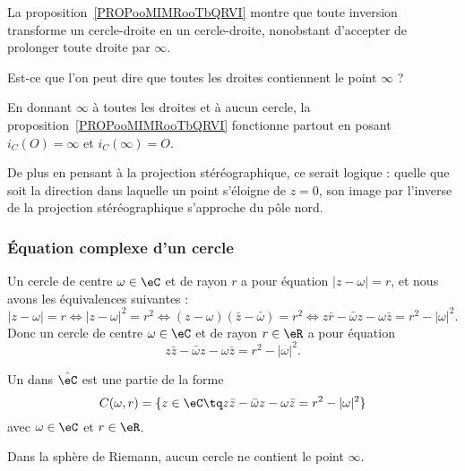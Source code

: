 \begin{probleme}        \label{PROBooZHHTooIFNwxR}
    La proposition~\ref{PROPooMIMRooTbQRVI} montre que toute inversion transforme un cercle-droite en un cercle-droite, nonobstant d'accepter de prolonger toute droite par \( \infty\).

    Est-ce que l'on peut dire que toutes les droites contiennent le point \( \infty\) ?

    En donnant \( \infty\) à toutes les droites et à aucun cercle, la proposition~\ref{PROPooMIMRooTbQRVI} fonctionne partout en posant \( i_C(O)=\infty\) et \( i_C(\infty)=O\).

    De plus en pensant à la projection stéréographique, ce serait logique : quelle que soit la direction dans laquelle un point s'éloigne de \( z=0\), son image par l'inverse de la projection stéréographique s'approche du pôle nord.
\end{probleme}

\subsubsection{Équation complexe d'un cercle}

Un cercle de centre \( \omega\in \eC\) et de rayon \( r\) a pour équation \( | z-\omega |=r\), et nous avons les équivalences suivantes :
\begin{equation}
    | z-\omega |=r\Leftrightarrow | z-\omega |^2=r^2\Leftrightarrow (z-\omega)(\bar z-\bar \omega)=r^2\Leftrightarrow z\bar r-\bar \omega z-\omega \bar z=r^2-| \omega |^2.
\end{equation}
Donc un cercle de centre \( \omega\in \eC\) et de rayon \( r\in \eR\) a pour équation
\begin{equation}        \label{EQooDIFRooKRZZoi}
    z\bar z-\bar\omega z-\omega\bar z=r^2-| \omega |^2.
\end{equation}

\begin{definition}      \label{DEFooAUDJooVqLDhe}
    Un  dans \( \hat\eC\) est une partie de la forme
    \begin{equation}
        C(\omega,r)=\{ z\in \eC\tq z\bar z-\bar\omega z-\omega\bar z=r^2-| \omega |^2 \}
    \end{equation}
    avec \( \omega\in \eC\) et \( r\in \eR\).
\end{definition}
Dans la sphère de Riemann, aucun cercle ne contient le point \( \infty\).

